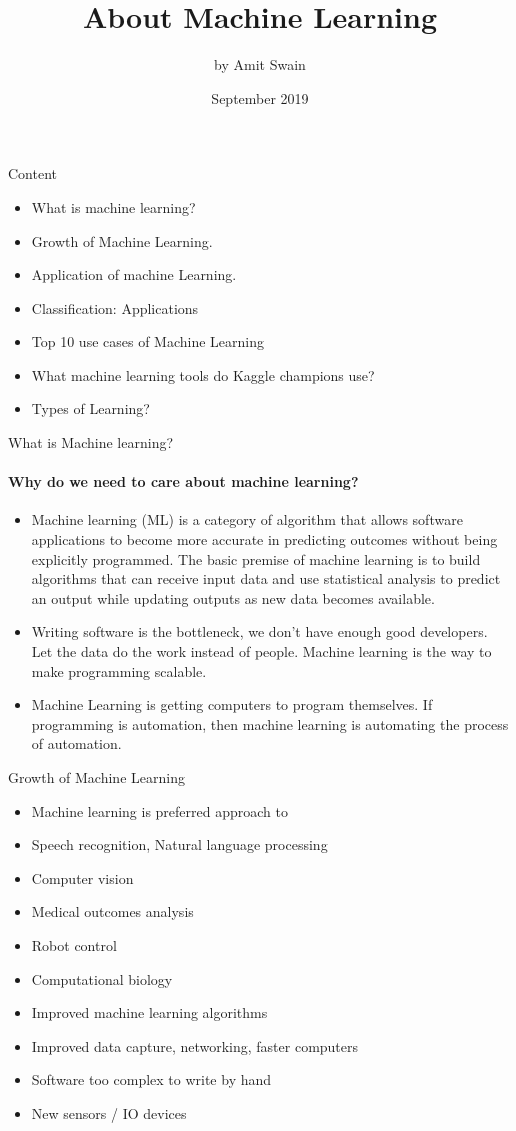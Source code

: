 \documentclass{beamer}
\title{About Machine Learning}
\author{by Amit Swain}
\date{September 2019}
\begin{document}
\maketitle
\begin{frame}{Content}
\begin{itemize}
\item What is machine learning? 
\item Growth of Machine Learning.
\item Application of machine Learning. 
\item Classification:  Applications
 \item Top 10 use cases of Machine Learning
 \item What machine learning tools do Kaggle champions use?
    \item Types of Learning? 
\end{itemize}
\end{frame}
\begin{frame}{What is Machine learning?}
\framesubtitle{Why do we need to care about machine learning?}
\begin{itemize}
    \item Machine learning (ML) is a category of algorithm that allows software applications to become more accurate in predicting outcomes without being explicitly programmed. The basic premise of machine learning is to build algorithms that can receive input data and use statistical analysis to predict an output while updating outputs as new data becomes available.
    \item Writing software is the bottleneck, we don’t have enough good developers. Let the data do the work instead of people. Machine learning is the way to make programming scalable.
    \item Machine Learning is getting computers to program themselves. If programming is automation, then machine learning is automating the process of automation.
\end{itemize}
\end{frame}
\begin{frame}{Growth of Machine Learning}
   \begin{itemize}
       \item Machine learning is preferred approach to
       \item Speech recognition, Natural language processing
       \item Computer vision
       \item Medical outcomes analysis
    \item Robot control
    \item Computational biology
    \item Improved machine learning algorithms
    \item Improved data capture, networking, faster computers
    \item Software too complex to write by hand
    \item New sensors / IO devices
\end{itemize}
\end{frame}
\end{document}
